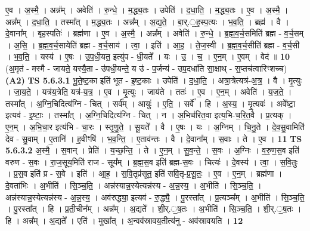 \documentclass[17pt]{extarticle}
\begin{document}
                  ए॒व । अ॒स्मै॒ । अन्न᳚म् । अवेति॑ । रु॒न्धे॒ । म॒द्ध्य॒तः । उपेति॑ । द॒धा॒ति॒ । म॒द्ध्य॒तः । ए॒व । अ॒स्मै॒ । अन्न᳚म् । द॒धा॒ति॒ । तस्मा᳚त् । म॒द्ध्य॒तः । अन्न᳚म् । अ॒द्य॒ते॒ । बा॒र्.॒ह॒स्प॒त्यः । भ॒व॒ति॒ । ब्रह्म॑ । वै । दे॒वाना᳚म् । बृह॒स्पतिः॑ । ब्रह्म॑णा । ए॒व । अ॒स्मै॒ । अन्न᳚म् । अवेति॑ ।       रु॒न्धे॒ । ब्र॒ह्म॒व॒र्च॒समिति॑ ब्रह्म - व॒र्च॒सम् । अ॒सि॒ । ब्र॒ह्म॒व॒र्च॒सायेति॑ ब्रह्म - व॒र्च॒साय॑ । त्वा॒ । इति॑ । आ॒ह॒ । ते॒ज॒स्वी । ब्र॒ह्म॒व॒र्च॒सीति॑ ब्रह्म - व॒र्च॒सी । भ॒व॒ति॒ । यस्य॑ । ए॒षः । उ॒प॒धी॒यत॒ इत्यु॑प - धी॒यते᳚ । यः । उ॒ । च॒ । ए॒न॒म् । ए॒वम् । वेद॑ ॥ \textbf{  10} \newline
                  \newline
                      (अ॒मृत॑ - मस्मै - जायते॒ यस्यै॒ता - उ॑पधी॒यन्ते॒ य उ॑ - प॒र्जन्य॑ - उप॒दधा॑ति सा॒क्षाथ् - स॒प्तच॑त्वारिꣳशच्च)  \textbf{(A2)} \newline \newline
                                \textbf{ TS 5.6.3.1} \newline
                  भू॒ते॒ष्ट॒का इति॑ भूत - इ॒ष्ट॒काः । उपेति॑ । द॒धा॒ति॒ । अत्रा॒त्रेत्यत्र॑-अ॒त्र॒ । वै । मृ॒त्युः । जा॒य॒ते॒ । यत्र॑य॒त्रेति॒ यत्र॑-य॒त्र॒ । ए॒व । मृ॒त्युः । जाय॑ते । ततः॑ । ए॒व । ए॒न॒म् । अवेति॑ । य॒ज॒ते॒ । तस्मा᳚त् । अ॒ग्नि॒चिदित्य॑ग्नि - चित् । सर्व᳚म् । आयुः॑ । ए॒ति॒ । सर्वे᳚ । हि । अ॒स्य॒ । मृ॒त्यवः॑ । अवे᳚ष्टा॒ इत्यव॑ - इ॒ष्टाः॒ । तस्मा᳚त् । अ॒ग्नि॒चिदित्य॑ग्नि - चित् । न । अ॒भिच॑रित॒वा इत्य॒भि-च॒रि॒त॒वै । प्र॒त्यक् । ए॒न॒म् । अ॒भि॒चा॒र इत्य॑भि - चा॒रः । स्तृ॒णु॒ते॒ । सू॒यते᳚ । वै । ए॒षः । यः । अ॒ग्निम् । चि॒नु॒ते । दे॒व॒सु॒वामिति॑ देव - सु॒वाम् । ए॒तानि॑ । ह॒वीꣳषि॑ । भ॒व॒न्ति॒ । ए॒ताव॑न्तः । वै । दे॒वाना᳚म् । स॒वाः । ते । ए॒व । \textbf{  11} \newline
                  \newline
                                \textbf{ TS 5.6.3.2} \newline
                  अ॒स्मै॒ । स॒वान् । प्रेति॑ । य॒च्छ॒न्ति॒ । ते । ए॒न॒म् । सु॒व॒न्ते॒ । स॒वः । अ॒ग्निः । व॒रु॒ण॒स॒व इति॑ वरुण - स॒वः । रा॒ज॒सूय॒मिति॑ राज - सूय᳚म् । ब्र॒ह्म॒स॒व इति॑ ब्रह्म-स॒वः । चित्यः॑ । दे॒वस्य॑ । त्वा॒ । स॒वि॒तुः । प्र॒स॒व इति॑ प्र - स॒वे । इति॑ । आ॒ह॒ । स॒वि॒तृप्र॑सूत॒ इति॑ सवि॒तृ-प्र॒सू॒तः॒ । ए॒व । ए॒न॒म् । ब्रह्म॑णा । दे॒वता॑भिः । अ॒भीति॑ । सि॒ञ्च॒ति॒ । अन्न॑स्यान्न॒स्येत्यन्न॑स्य - अ॒न्न॒स्य॒ । अ॒भीति॑ । सि॒ञ्च॒ति॒ । अन्न॑स्यान्न॒स्येत्यन्न॑स्य - अ॒न्न॒स्य॒ । अव॑रुद्ध्या॒ इत्यव॑ - रु॒द्ध्यै॒ । पु॒रस्ता᳚त् । प्र॒त्यञ्च᳚म् । अ॒भीति॑ । सि॒ञ्च॒ति॒ । पु॒रस्ता᳚त् । हि । प्र॒ती॒चीन᳚म् । अन्न᳚म् । अ॒द्यते᳚ । शी॒र्.॒ष॒तः । अ॒भीति॑ । सि॒ञ्च॒ति॒ । शी॒र्.॒ष॒तः । हि । अन्न᳚म् । अ॒द्यते᳚ । एति॑ । मुखा᳚त् । अ॒न्वव॑स्रावय॒तीत्य॑नु - अव॑स्रावयति । \textbf{  12} \newline
\end{document}

